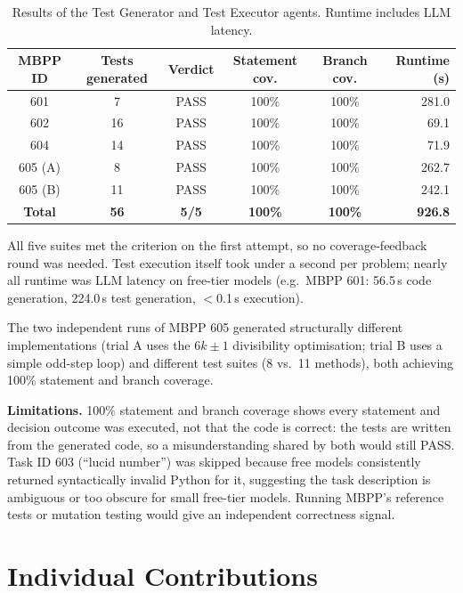 \documentclass[11pt,a4paper]{article}
\begin{document}
\begin{table}[H]
\centering\small
\begin{tabular}{c c c c c r}
\toprule
MBPP ID & Tests generated & Verdict & Statement cov. & Branch cov. & Runtime (s)\\
\midrule
601         &  7 & PASS & 100\% & 100\% & 281.0\\
602         & 16 & PASS & 100\% & 100\% &  69.1\\
604         & 14 & PASS & 100\% & 100\% &  71.9\\
605 (A)     &  8 & PASS & 100\% & 100\% & 262.7\\
605 (B)     & 11 & PASS & 100\% & 100\% & 242.1\\
\midrule
\textbf{Total} & \textbf{56} & \textbf{5/5} & \textbf{100\%} & \textbf{100\%} & \textbf{926.8}\\
\bottomrule
\end{tabular}
\caption{Results of the Test Generator and Test Executor agents. Runtime includes LLM latency.}
\end{table}

All five suites met the criterion on the first attempt, so no coverage-feedback round
was needed. Test execution itself took under a second per problem; nearly all runtime
was LLM latency on free-tier models (e.g.\ MBPP 601: 56.5\,s code generation,
224.0\,s test generation, $<$0.1\,s execution).

The two independent runs of MBPP 605 generated structurally different implementations
(trial A uses the $6k\pm1$ divisibility optimisation; trial B uses a simple odd-step
loop) and different test suites (8 vs.\ 11 methods), both achieving 100\% statement
and branch coverage.

\textbf{Limitations.} 100\% statement and branch coverage shows every statement and
decision outcome was executed, not that the code is correct: the tests are written
from the generated code, so a misunderstanding shared by both would still PASS. Task ID
603 (``lucid number'') was skipped because free models consistently returned
syntactically invalid Python for it, suggesting the task description is ambiguous or
too obscure for small free-tier models. Running MBPP's reference tests or mutation
testing would give an independent correctness signal.

\section{Individual Contributions}
\end{document}
